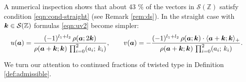 \documentclass[a4paper,12pt]{article}
\theoremstyle{plain}
\def\Z{\mathbb{Z}}
\def\cS{\mathcal{S}}
\def\ba{\mbox{\boldmath $a$}}
\def\bk{\mbox{\boldmath $k$}}
\begin{document}
A numerical inspection shows that about 43 \% of the vectors in 
$\cS(\Z)$ satisfy condition \eqref{eqn:cond-straight} (see Remark \ref{rem:ds}). 
In the straight case with $\bk \in \cS(\Z)$ formulas \eqref{eqn:uv2} become simpler: 
\begin{equation} \label{eqn:uv3}
u(\ba) = \dfrac{(-1)^{l_1+l_2} \, \rho(\ba; 2 \bk)}{\rho(\ba+\bk; \bk) \, 
\prod_{i=0}^2 (a_i; \, k_i)}, 
\qquad 
v(\ba) = -\dfrac{(-1)^{l_1+l_2} \, \rho(\ba; \bk) \cdot 
\langle \ba+\bk; \bk \rangle_+}{\rho(\ba+\bk; \bk) \, 
\prod_{i=0}^2 (a_i; \, k_i)}.  
\end{equation} 
\par
We turn our attention to continued fractions of twisted type in 
Definition \ref{def:admissible}.  
\end{document}
